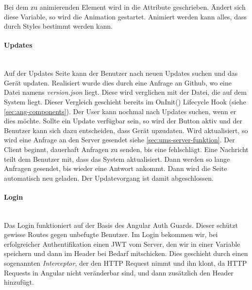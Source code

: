 Bei dem zu animierenden Element wird  in die Attribute geschrieben. Ändert sich diese Variable, so wird die Animation gestartet. Animiert werden kann alles, dass durch Styles bestimmt werden kann.

\paragraph*{Updates}\mbox{}\\
\label{par:funk-upd}
Auf der Updates Seite kann der Benutzer nach neuen Updates suchen und das Gerät updaten. Realisiert wurde dies durch eine Anfrage an Github, wo eine Datei namens \textit{version.json} liegt. Diese wird verglichen mit der Datei, die auf dem System liegt. Dieser Vergleich geschieht bereits im OnInit() Lifecycle Hook (siehe \ref{sec:ang-components}). Der User kann nochmal nach Updates suchen, wenn er dies möchte. Sollte ein Update verfügbar sein, so wird der Button aktiv und der Benutzer kann sich dazu entscheiden, dass Gerät upzudaten. Wird aktualisiert, so wird eine Anfrage an den Server gesendet siehe \ref{sec:ums-server-funktion}. Der Client beginnt, dauerhaft Anfragen zu senden, bis eine fehlschlägt. Eine Nachricht teilt dem Benutzer mit, dass das System aktualisiert. Dann werden so lange Anfragen gesendet, bis wieder eine Antwort ankommt. Dann wird die Seite automatisch neu geladen. Der Updatevorgang ist damit abgeschlossen.

\paragraph*{Login}\mbox{}\\
Das Login funktioniert auf der Basis des Angular Auth Guards. Dieser schützt gewisse Routes gegen unbefugte Benutzer. Im Login bekommen wir, bei erfolgreicher Authentifikation einen \ac{JWT} vom Server, den wir in einer Variable speichern und dann im  Header bei Bedarf mitschicken. Dies geschieht durch einen sogenannten \textit{Interceptor}, der den \ac{HTTP} Request nimmt und ihn klont, da \ac{HTTP} Requests in Angular nicht veränderbar sind, und dann zusätzlich den  Header hinzufügt.

